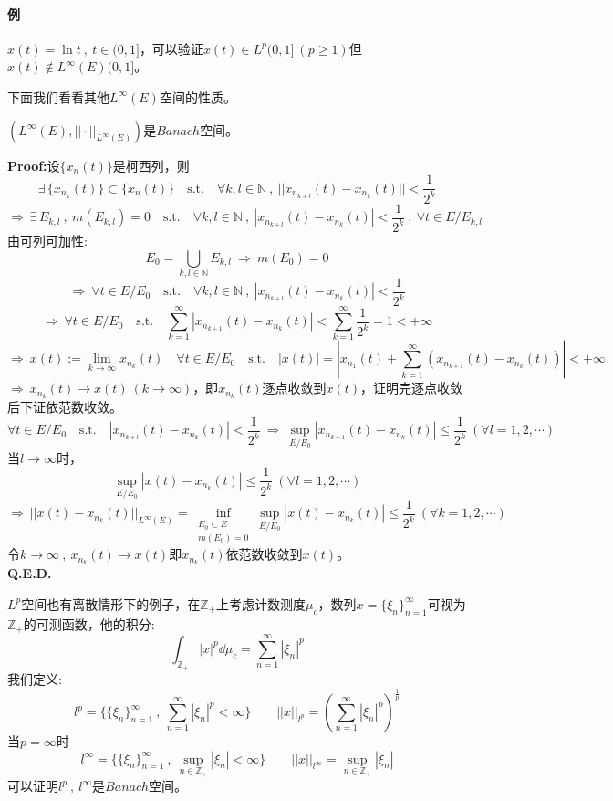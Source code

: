 \paragraph*{例} \quad $x(t)=\ln t \ , \ t \in (0,1]$，可以验证$x(t) \in L^p(0,1] \ (p \geq 1)$但$x(t) \notin L^{\infty}(E)(0,1]$。

下面我们看看其他$L^{\infty}(E)$空间的性质。
\begin{theorem}
    $(L^{\infty}(E),||\cdot||_{L^{\infty}(E)})$是$Banach$空间。
\end{theorem}
\textbf{Proof:}设$\{x_n(t)\}$是柯西列，则
\[\exists \, \{x_{n_{k}}(t)\} \subset \{x_n(t)\} \quad \text{s.t.} \quad \forall k,l \in \mathbb{N} \ , \ ||x_{n_{k+l}}(t)-x_{n_{k}}(t)||<\frac{1}{2^k}\]
\[\Rightarrow \ \exists \, E_{k,l} \ , \ m(E_{k,l})=0 \quad \text{s.t.} \quad \forall k,l \in \mathbb{N} \ , \ |x_{n_{k+l}}(t)-x_{n_{k}}(t)|<\frac{1}{2^k} \ , \ \forall t \in E/E_{k,l}\]
由可列可加性:
\[E_0=\bigcup_{k,l\in \mathbb{N}}E_{k,l} \ \Rightarrow \ m(E_0)=0\]
\[\Rightarrow \ \forall t \in E/E_0 \quad \text{s.t.} \quad \forall k,l \in \mathbb{N} \ , \ |x_{n_{k+l}}(t)-x_{n_{k}}(t)|<\frac{1}{2^k}\]
\[\Rightarrow \ \forall t \in E/E_0 \quad \text{s.t.} \quad \sum_{k=1}^{\infty}|x_{n_{k+1}}(t)-x_{n_{k}}(t)|<\sum_{k=1}^{\infty}\frac{1}{2^k}=1<+\infty\]
\[\Rightarrow \ x(t):=\lim_{k \to \infty}x_{n_k}(t) \quad \forall t \in E/E_0 \quad \text{s.t.} \quad |x(t)|=\left|x_{n_1}(t)+\sum_{k=1}^{\infty}(x_{n_{k+1}}(t)-x_{n_{k}}(t))\right|<+\infty\]
$\Rightarrow \ x_{n_k}(t) \to x(t) \ (k \to \infty)$，即$x_{n_k}(t)$逐点收敛到$x(t)$，证明完逐点收敛后下证依范数收敛。
\[\forall t \in E/E_0 \quad \text{s.t.} \quad |x_{n_{k+l}}(t)-x_{n_{k}}(t)|<\frac{1}{2^k} \ \Rightarrow \ \mathop \text{sup}\limits_{E/E_0}|x_{n_{k+1}}(t)-x_{n_{k}}(t)| \leq \frac{1}{2^k} \ (\forall l=1,2,\cdots)\]
当$l \to \infty$时，
\[\mathop \text{sup}\limits_{E/E_0}|x(t)-x_{n_{k}}(t)| \leq \frac{1}{2^k} \ (\forall l=1,2,\cdots)\]
\[\Rightarrow \ ||x(t)-x_{n_k}(t)||_{L^{\infty}(E)}=\mathop \text{inf}\limits_{\substack{E_0 \subset E \\ m(E_0)=0}} \mathop \text{sup}\limits_{E/E_0}|x(t)-x_{n_{k}}(t)| \leq \frac{1}{2^k} \ (\forall k=1,2,\cdots)\]
令$k \to \infty \ , \ x_{n_k}(t) \to x(t)$即$x_{n_k}(t)$依范数收敛到$x(t)$。\\
\textbf{Q.E.D.}

$L^p$空间也有离散情形下的例子，在$\mathbb{Z}_+$上考虑计数测度$\mu_c$，数列$x=\{\xi_n\}_{n=1}^{\infty}$可视为$\mathbb{Z}_+$的可测函数，他的积分:
\[\int_{\mathbb{Z}_+}|x|^p\dd\mu_c=\sum_{n=1}^{\infty}|\xi_n|^p\]
我们定义:
\[l^p=\{\{\xi_n\}_{n=1}^{\infty} \ , \ \sum_{n=1}^{\infty}|\xi_n|^p<\infty\} \qquad ||x||_{l^p}=\left(\sum_{n=1}^{\infty}|\xi_n|^p\right)^{\frac{1}{p}}\]
当$p=\infty$时
\[l^{\infty}=\{\{\xi_n\}_{n=1}^{\infty} \ , \ \mathop \text{sup}\limits_{n \in \mathbb{Z}_+}|\xi_n|<\infty\} \qquad ||x||_{l^{\infty}}=\mathop \text{sup}\limits_{n \in \mathbb{Z}_+}|\xi_n|\]
可以证明$l^p \ , \ l^{\infty}$是$Banach$空间。
